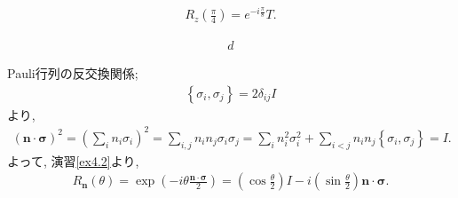 \begin{ex}
    \label{ex4.3}
    \begin{align*}
        R_z\left( \frac{\pi}{4}\right) = e^{ - i \frac{\pi}{8}} T .
    \end{align*}
\end{ex}

\begin{ex}
    \label{ex4.4}
    \begin{align*}
        d
    \end{align*}
\end{ex}

\begin{ex}
    \label{ex4.5}
    Pauli行列の反交換関係;
    \begin{align*}
        \left\{\sigma_i ,\sigma_j \right\} = 2\delta_{ij} I
    \end{align*}
    より,
    \begin{align*}
        \left( \bm{n} \cdot \bm{\sigma}\right)^2
        = \left( \sum_i n_i \sigma_i \right)^2
        = \sum_{i,j} n_i n_j \sigma_i \sigma_j
        = \sum_i n_i^2 \sigma_i^2 + \sum_{i< j} n_i n_j \left\{\sigma_i ,\sigma_j \right\}
        =
        I.
    \end{align*}
    よって, 演習\ref{ex4.2}より,
    \begin{align*}
        R_{\bm{n}}(\theta)
        =
        \exp\left(- i \theta \frac{\bm{n} \cdot \bm{\sigma}}{2}\right)
        =
        \left(\cos \frac{\theta}{2}\right) I - i\left(\sin \frac{\theta}{2}\right) \bm{n} \cdot \bm{\sigma}.
    \end{align*}
\end{ex}

